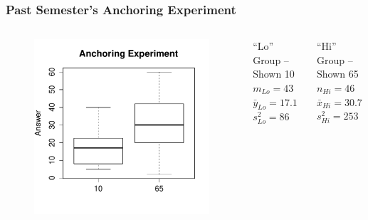 \documentclass[handout]{beamer}
\begin{document}
\begin{frame}[t]
\frametitle{Past Semester's Anchoring Experiment}

\begin{columns}
	\begin{figure}
	\centering
	\includegraphics[scale = 0.4]{./images/anchoring_boxplot}
	\end{figure}

	\begin{block}{``Lo'' Group -- Shown 10 }
	$m_{Lo} = 43$\\ $\bar{y}_{Lo} = 17.1$ \\ $s^2_{Lo} = 86$
\end{block}
		\begin{block}{``Hi'' Group -- Shown 65 }
		$n_{Hi} =46$\\ $\bar{x}_{Hi} = 30.7$\\ $s^2_{Hi} = 253$
\end{block}

\end{columns}
\end{frame}
\end{document}
